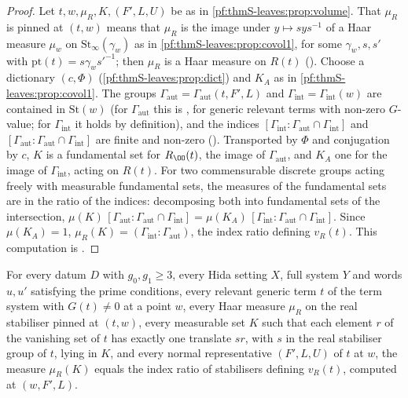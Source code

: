 \begin{proof}
Let $t,w,\mu_R,K,(F',L,U)$ be as in \cref{pf:thmS-leaves:prop:volume}. That $\mu_R$ is pinned at $(t,w)$ means that $\mu_R$ is the image under
$y\mapsto sys^{-1}$ of a Haar measure $\mu_w$ on $\mathrm{St}_\infty(\gamma_w)$ as in \cref{pf:thmS-leaves:prop:covol1}, for some $\gamma_w,s,s'$ with
$\mathrm{pt}(t)=s\gamma_ws'^{-1}$; then $\mu_R$ is a Haar measure on $R(t)$ (). Choose a dictionary
$(c,\Phi)$ (\cref{pf:thmS-leaves:prop:dict}) and $K_A$ as in \cref{pf:thmS-leaves:prop:covol1}. The groups $\Gamma_{\mathrm{aut}}=\Gamma_{\mathrm{aut}}(t,F',L)$ and
$\Gamma_{\mathrm{int}}=\Gamma_{\mathrm{int}}(w)$ are contained in $\mathrm{St}(w)$ (for $\Gamma_{\mathrm{aut}}$ this is
, for generic relevant terms with non-zero $G$-value; for
$\Gamma_{\mathrm{int}}$ it holds by definition), and the indices $[\Gamma_{\mathrm{int}}:\Gamma_{\mathrm{aut}}\cap\Gamma_{\mathrm{int}}]$ and
$[\Gamma_{\mathrm{aut}}:\Gamma_{\mathrm{aut}}\cap\Gamma_{\mathrm{int}}]$ are finite and non-zero (). Transported by
$\Phi$ and conjugation by $c$, $K$ is a fundamental set for $R_{\OO}(t)$, the image of $\Gamma_{\mathrm{aut}}$, and $K_A$ one for the image of $\Gamma_{\mathrm{int}}$,
acting on $R(t)$. For two commensurable discrete groups acting freely with measurable fundamental sets, the measures of the
fundamental sets are in the ratio of the indices: decomposing both into fundamental sets of the intersection,
$\mu(K)\,[\Gamma_{\mathrm{aut}}:\Gamma_{\mathrm{aut}}\cap\Gamma_{\mathrm{int}}]=\mu(K_A)\,[\Gamma_{\mathrm{int}}:\Gamma_{\mathrm{aut}}\cap\Gamma_{\mathrm{int}}]$. Since $\mu(K_A)=1$,
$\mu_R(K)=(\Gamma_{\mathrm{int}}:\Gamma_{\mathrm{aut}})$, the index ratio defining $v_R(t)$. This computation is
.
\end{proof}
\begin{proposition}\label{pf:thmS-leaves:prop:volume}
For every datum $D$ with $g_0,g_1\ge3$, every Hida setting $X$, full system $Y$ and words $u,u'$ satisfying the prime conditions, every
relevant generic term $t$ of the term system with $G(t)\ne0$ at a point $w$, every Haar measure $\mu_R$ on the real stabiliser pinned at
$(t,w)$, every measurable set $K$ such that each element $r$ of the vanishing set of $t$ has exactly one translate $sr$, with $s$ in
the real stabiliser group of $t$, lying in $K$, and every normal representative $(F',L,U)$ of $t$ at $w$, the measure $\mu_R(K)$
equals the index ratio of stabilisers defining $v_R(t)$, computed at $(w,F',L)$.
\end{proposition}

